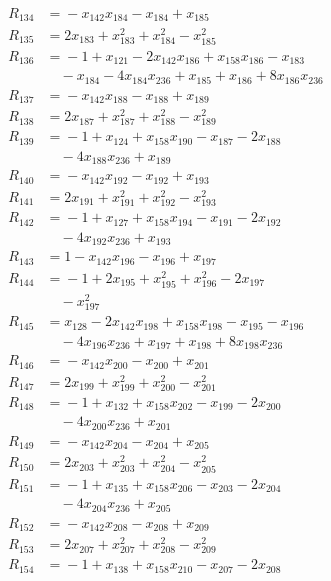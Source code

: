 \begin{align*}
R_{134} &={} -x_{142}x_{184} -x_{184} +x_{185} \\
R_{135} &={} 2x_{183} +x_{183}^{2} +x_{184}^{2} -x_{185}^{2} \\
R_{136} &={} -1 +x_{121} -2x_{142}x_{186} +x_{158}x_{186} -x_{183} \\
&\quad{} -x_{184} -4x_{184}x_{236} +x_{185} +x_{186} +8x_{186}x_{236} \\
R_{137} &={} -x_{142}x_{188} -x_{188} +x_{189} \\
R_{138} &={} 2x_{187} +x_{187}^{2} +x_{188}^{2} -x_{189}^{2} \\
R_{139} &={} -1 +x_{124} +x_{158}x_{190} -x_{187} -2x_{188} \\
&\quad{} -4x_{188}x_{236} +x_{189} \\
R_{140} &={} -x_{142}x_{192} -x_{192} +x_{193} \\
R_{141} &={} 2x_{191} +x_{191}^{2} +x_{192}^{2} -x_{193}^{2} \\
R_{142} &={} -1 +x_{127} +x_{158}x_{194} -x_{191} -2x_{192} \\
&\quad{} -4x_{192}x_{236} +x_{193} \\
R_{143} &={} 1 -x_{142}x_{196} -x_{196} +x_{197} \\
R_{144} &={} -1 +2x_{195} +x_{195}^{2} +x_{196}^{2} -2x_{197} \\
&\quad{} -x_{197}^{2} \\
R_{145} &={} x_{128} -2x_{142}x_{198} +x_{158}x_{198} -x_{195} -x_{196} \\
&\quad{} -4x_{196}x_{236} +x_{197} +x_{198} +8x_{198}x_{236} \\
R_{146} &={} -x_{142}x_{200} -x_{200} +x_{201} \\
R_{147} &={} 2x_{199} +x_{199}^{2} +x_{200}^{2} -x_{201}^{2} \\
R_{148} &={} -1 +x_{132} +x_{158}x_{202} -x_{199} -2x_{200} \\
&\quad{} -4x_{200}x_{236} +x_{201} \\
R_{149} &={} -x_{142}x_{204} -x_{204} +x_{205} \\
R_{150} &={} 2x_{203} +x_{203}^{2} +x_{204}^{2} -x_{205}^{2} \\
R_{151} &={} -1 +x_{135} +x_{158}x_{206} -x_{203} -2x_{204} \\
&\quad{} -4x_{204}x_{236} +x_{205} \\
R_{152} &={} -x_{142}x_{208} -x_{208} +x_{209} \\
R_{153} &={} 2x_{207} +x_{207}^{2} +x_{208}^{2} -x_{209}^{2} \\
R_{154} &={} -1 +x_{138} +x_{158}x_{210} -x_{207} -2x_{208} \\

\end{align*}

